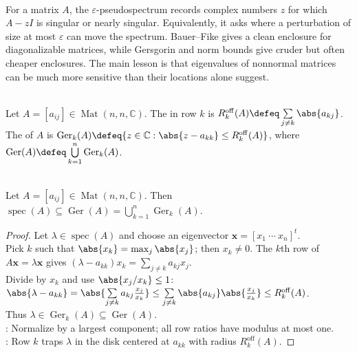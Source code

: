 \begin{perspective} \label{per:pseudospectral-intuition} \\
For a matrix $A$, the $\varepsilon$-pseudospectrum records complex numbers $z$ for which $A-zI$ is singular or nearly singular. Equivalently, it asks where a perturbation of size at most $\varepsilon$ can move the spectrum. Bauer--Fike gives a clean enclosure for diagonalizable matrices, while Gersgorin and norm bounds give cruder but often cheaper enclosures. The main lesson is that eigenvalues of nonnormal matrices can be much more sensitive than their locations alone suggest.
\end{perspective}

\begin{definition} \label{def:gersgorin-disks} \\
Let $A=[a_{ij}]\in\operatorname{Mat}(n,n,\mathbb{C})$. The  in row $k$ is $R_k^{\mathrm{off}}(A)\defeq\sum\limits_{j\neq k}\abs{a_{kj}}$.\\
The  of $A$ is $\operatorname{Ger}_k(A)\defeq\{z\in\mathbb{C}:\abs{z-a_{kk}}\leq R_k^{\mathrm{off}}(A)\}$, where $\operatorname{Ger}(A)\defeq\bigcup\limits_{k=1}^{n}\operatorname{Ger}_k(A)$.
\end{definition}

\begin{theorem} \label{thm:gersgorin-disk-theorem} \\
Let $A=[a_{ij}]\in\operatorname{Mat}(n,n,\mathbb{C})$. Then $\operatorname{spec}(A)\subseteq \operatorname{Ger}(A)=\bigcup\limits_{k=1}^{n}\operatorname{Ger}_k(A)$.
\begin{proof}
Let $\lambda\in\operatorname{spec}(A)$ and choose an eigenvector $\mathbf{x}=[x_1\ \cdots\ x_n]^t$.\\
Pick $k$ such that $\abs{x_k}=\max_j\abs{x_j}$; then $x_k\neq0$. The $k$th row of $A\mathbf{x}=\lambda\mathbf{x}$ gives $(\lambda-a_{kk})x_k=\sum\limits_{j\neq k}a_{kj}x_j$.\\
Divide by $x_k$ and use $\abs{x_j/x_k}\leq1$: $\abs{\lambda-a_{kk}} =\abs{\sum\limits_{j\neq k}a_{kj}\frac{x_j}{x_k}} \leq\sum\limits_{j\neq k}\abs{a_{kj}}\abs{\frac{x_j}{x_k}} \leq R_k^{\mathrm{off}}(A)$.\\
Thus $\lambda\in \operatorname{Ger}_k(A)\subseteq \operatorname{Ger}(A)$.\\
: Normalize by a largest component; all row ratios have modulus at most one.\\
: Row $k$ traps $\lambda$ in the disk centered at $a_{kk}$ with radius $R_k^{\mathrm{off}}(A)$.
\end{proof}
\end{theorem}

